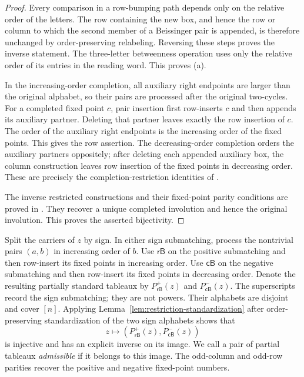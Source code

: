 \documentclass[11pt]{article}
\theoremstyle{definition}
\theoremstyle{remark}
\newcommand{\PRBSp}{P_{\mathsf{rB}}^{+}}
\newcommand{\PCBSm}{P_{\mathsf{cB}}^{-}}
\begin{document}
\begin{proof}
Every comparison in a row-bumping path depends only on the relative order
of the letters.  The row containing the new box, and hence the row or
column to which the second member of a Beissinger pair is appended, is
therefore unchanged by order-preserving relabeling.  Reversing these steps
proves the inverse statement.  The three-letter betweenness operation uses
only the relative order of its entries in the reading word.  This proves
(a).

In the increasing-order completion, all auxiliary right endpoints are larger than
the original alphabet, so their pairs are processed after the original
two-cycles.  For a completed fixed point $c$, pair insertion first
row-inserts $c$ and then appends its auxiliary partner.  Deleting that
partner leaves exactly the row insertion of $c$.  The order of the
auxiliary right endpoints is the increasing order of the fixed points.
This gives the row assertion.  The decreasing-order completion orders the
auxiliary partners oppositely; after deleting each appended auxiliary box,
the column construction leaves row insertion of the fixed points in
decreasing order.  These are precisely the completion-restriction
identities of \cite[Lemmas~3.13 and~3.16]{MZInsertion}.

The inverse restricted constructions and their fixed-point parity
conditions are proved in
\cite[Lemmas~3.13, 3.16 and Theorems~3.14, 3.17]{MZInsertion}.  They
recover a unique completed involution and hence the original involution.
This proves the asserted bijectivity.
\end{proof}

Split the carriers of $z$ by sign.  In either sign submatching, process
the nontrivial pairs $(a,b)$ in increasing order of $b$.  Use
$\mathsf{rB}$ on the
positive submatching and then row-insert its fixed points in increasing
order.  Use $\mathsf{cB}$ on the negative submatching and then row-insert
its fixed points in decreasing order.  Denote the resulting partially
standard tableaux by $\PRBSp(z)$ and $\PCBSm(z)$.  The superscripts record
the sign submatching; they are not powers.  Their alphabets are disjoint
and cover $[n]$.  Applying Lemma~\ref{lem:restriction-standardization} after
order-preserving standardization of the two sign alphabets shows that
\begin{equation}
                      z\longmapsto(\PRBSp(z),\PCBSm(z))
\label{eq:split-insertion}
\end{equation}
is injective and has an explicit inverse on its image.  We call a pair of
partial tableaux \emph{admissible} if it belongs to this image.
The odd-column and odd-row parities recover the positive and negative
fixed-point numbers.
\end{document}
